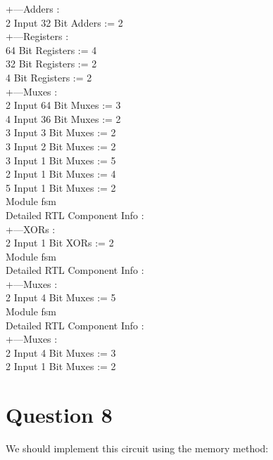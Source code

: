 \documentclass[paper=b4, fontsize=11pt]{scrartcl} %
\numberwithin{equation}{section} %
\numberwithin{figure}{section} %
\numberwithin{table}{section} %
\begin{document}
+---Adders : \\
	   2 Input     32 Bit       Adders := 2 \\
+---Registers : \\
	               64 Bit    Registers := 4 \\
	               32 Bit    Registers := 2 \\
	                4 Bit    Registers := 2 \\
+---Muxes :                                 \\
	   2 Input     64 Bit        Muxes := 3 \\
	   4 Input     36 Bit        Muxes := 2 \\
	   3 Input      3 Bit        Muxes := 2 \\
	   3 Input      2 Bit        Muxes := 2 \\
	   3 Input      1 Bit        Muxes := 5 \\
	   2 Input      1 Bit        Muxes := 4 \\
	   5 Input      1 Bit        Muxes := 2 \\
Module fsm\\
Detailed RTL Component Info :               \\
+---XORs :                                  \\
	   2 Input      1 Bit         XORs := 2 \\
Module fsm \\
Detailed RTL Component Info :               \\
+---Muxes :                                 \\
	   2 Input      4 Bit        Muxes := 5 \\
Module fsm                       \\
Detailed RTL Component Info :               \\
+---Muxes :                                 \\
	   2 Input      4 Bit        Muxes := 3 \\
	   2 Input      1 Bit        Muxes := 2

\section{Question 8}
We should implement this circuit using the memory method:
\end{document}

